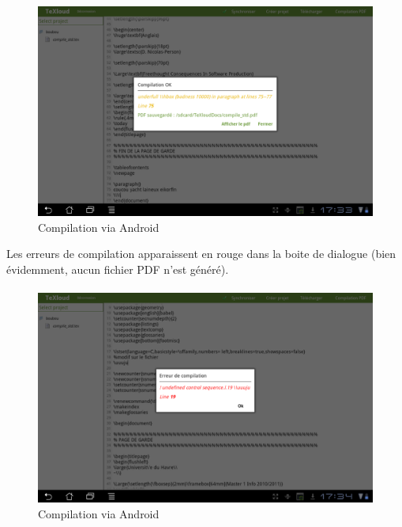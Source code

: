 \documentclass[a4paper,12pt]{article}
\begin{document}
\bigskip
\begin{figure}[!ht]
\begin{center}
  \includegraphics[width=1\textwidth]{./images/screenshot/compil_android.png}
\end{center}
  \caption{Compilation via Android}
  \label{Compilation via Android}
\end{figure}
\clearpage
Les erreurs de compilation apparaissent en rouge dans la boite de dialogue (bien évidemment, aucun fichier PDF n'est généré).

\paragraph*{}
\begin{figure}[!ht]
\begin{center}
  \includegraphics[width=1\textwidth]{./images/screenshot/errorCompil_android.png}
\end{center}
  \caption{Compilation via Android}
  \label{Compilation via Android}
\end{figure}
\end{document}
